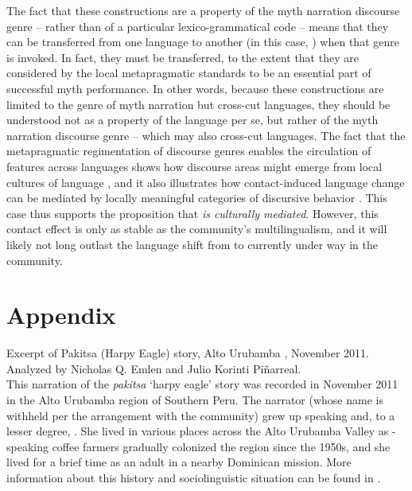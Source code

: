 \documentclass[output=paper]{LSP/langsci}
\begin{document}
The fact that these constructions are a property of the myth narration discourse genre – rather than of a particular lexico-grammatical code – means that they can be transferred from one language to another (in this case, ) when that genre is invoked. In fact, they must be transferred, to the extent that they are considered by the local metapragmatic standards to be an essential part of successful myth performance. In other words, because these constructions are limited to the genre of myth narration but cross-cut languages, they should be understood not as a property of the  language per se, but rather of the myth narration discourse genre – which may also cross-cut languages. The fact that the metapragmatic regimentation of discourse genres enables the circulation of features across languages shows how discourse areas might emerge from local cultures of language \citep[as in ;][]{beieretal.2002}, and it also illustrates how contact-induced language change can be mediated by locally meaningful categories of discursive behavior \citep[i.e., ‘culture’;][]{silverstein76}. This case thus supports the proposition that \textit{ is culturally mediated}. However, this contact effect is only as stable as the community’s multilingualism, and it will likely not long outlast the language shift from  to  currently under way in the community.
%



%
\section*{Appendix}
 \setcounter{equation}{0}
Excerpt of Pakitsa (Harpy Eagle) story, {Alto Urubamba} , November 2011. Analyzed by Nicholas Q. Emlen and Julio Korinti Piñarreal.\\

\noindent This narration of the  \textit{pakitsa} `harpy eagle' story was recorded in November 2011 in the {Alto Urubamba} region of Southern Peru. The narrator (whose name is withheld per the arrangement with the community) grew up speaking  and, to a lesser degree, . She lived in various places across the {Alto Urubamba} Valley as -speaking coffee farmers gradually colonized the region since the 1950s, and she lived for a brief time as an adult in a nearby Dominican mission. More information about this history and sociolinguistic situation can be found in \citet{emlen14,emlen.2015,emlen.2017,emlenforth}.
\end{document}
